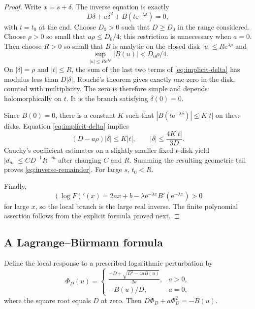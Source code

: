 \documentclass[11pt]{article}
\numberwithin{equation}{section}
\theoremstyle{definition}
\newcommand{\ee}{\mathrm e}
\begin{document}
\begin{proof}
Write $x=s+\delta$. The inverse equation is exactly
\begin{equation}\label{eq:implicit-delta}
 D\delta+a\delta^2+B(t\ee^{-\lambda\delta})=0,
\end{equation}
with $t=t_0$ at the end. Choose $D_0>0$ such that $D\ge D_0$ in the range considered. Choose $\rho>0$ so small that $a\rho\le D_0/4$; this restriction is unnecessary when $a=0$. Then choose $R>0$ so small that $B$ is analytic on the closed disk $|u|\le R\ee^{\lambda\rho}$ and
\[
 \sup_{|u|\le R\ee^{\lambda\rho}}|B(u)|<D_0\rho/4.
\]
On $|\delta|=\rho$ and $|t|\le R$, the sum of the last two terms of \eqref{eq:implicit-delta} has modulus less than $D|\delta|$. Rouch\'e's theorem gives exactly one zero in the disk, counted with multiplicity. The zero is therefore simple and depends holomorphically on $t$. It is the branch satisfying $\delta(0)=0$.

Since $B(0)=0$, there is a constant $K$ such that
$|B(t\ee^{-\lambda\delta})|\le K|t|$ on these disks. Equation \eqref{eq:implicit-delta} implies
\[
 (D-a\rho)|\delta|\le K|t|,
 \qquad |\delta|\le \frac{4K|t|}{3D}.
\]
Cauchy's coefficient estimates on a slightly smaller fixed $t$-disk yield
$|d_m|\le C D^{-1}R^{-m}$ after changing $C$ and $R$. Summing the resulting geometric tail proves \eqref{eq:inverse-remainder}. For large $s$, $t_0<R$.

Finally,
\[
 (\log F)'(x)=2ax+b-\lambda\ee^{-\lambda x}B'(\ee^{-\lambda x})>0
\]
for large $x$, so the local branch is the large real inverse. The finite polynomial assertion follows from the explicit formula proved next.
\end{proof}

\subsection{A Lagrange--B\"urmann formula}

Define the local response to a prescribed logarithmic perturbation by
\begin{equation}\label{eq:phi}
 \Phi_D(u)=\begin{cases}
 \displaystyle\frac{-D+\sqrt{D^2-4aB(u)}}{2a},&a>0,\\[0.8em]
 -B(u)/D,&a=0,
 \end{cases}
\end{equation}
where the square root equals $D$ at zero. Then $D\Phi_D+a\Phi_D^2=-B(u)$.
\end{document}
